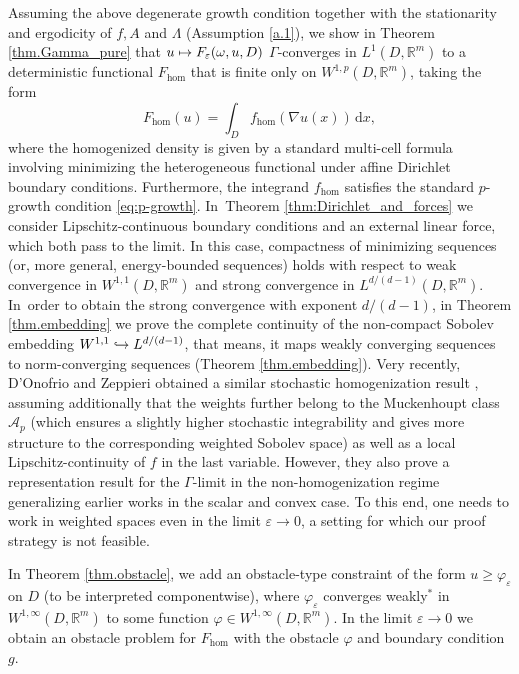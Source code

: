 \documentclass[JEP,XML,SOM,Unicode,published]{cedram}
\def\mto{\mathchoice{\longmapsto}{\mapsto}{\mapsto}{\mapsto}}
\def\hto{\mathrel{\lhook\joinrel\to}}
\theoremstyle{definition}
\let\e\varepsilon
\let\w\omega
\newcommand{\dx}{\,\mathrm{d}x}
\newcommand{\R}{\mathbb{R}}
\begin{document}
Assuming the above degenerate growth condition together with the stationarity and ergodicity of $f,A$ and $\Lambda$ (\cf Assumption \ref{a.1}), we show in Theorem \ref{thm.Gamma_pure} that $u\mto F_{\e}(\w,u,D)$ $\Gamma$-converges in $L^1(D,\R^m)$ to a deterministic functional $F_{\hom}$ that is finite only on $W^{1,p}(D,\R^m)$, taking the form\vspace*{-3pt}
\begin{equation*}
F_{\hom}(u)=\int_D f_{\hom}(\nabla u(x))\dx,
\end{equation*}
where the homogenized density is given by a standard multi-cell formula involving minimizing the heterogeneous functional under affine Dirichlet boundary conditions. Furthermore, the integrand $f_{\hom}$ satisfies the standard $p$-growth condition \eqref{eq:p-growth}. In~Theorem \ref{thm:Dirichlet_and_forces} we consider Lipschitz-continuous boundary conditions and an external linear force, which both pass to the limit. In this case, compactness of minimizing sequences (or, more general, energy-bounded sequences) holds with respect to weak convergence in $W^{1,1}(D,\R^m)$ and strong convergence in $L^{d/(d-1)}(D,\R^m)$. In~order to obtain the strong convergence with exponent $d/(d-1)$, in Theorem \ref{thm.embedding} we prove the complete continuity of the non-compact Sobolev embedding $W^{1,1}\hto\nobreak L^{d/(d-1)}$, that means, it maps weakly converging sequences to norm-converging sequences (\cf Theorem \ref{thm.embedding}). Very recently, D'Onofrio and Zeppieri obtained a similar stochastic homogenization result \cite{D'OnZe}, assuming additionally that the weights further belong to the Muckenhoupt class $\mathcal{A}_p$ (which ensures a slightly higher stochastic integrability and gives more structure to the corresponding weighted Sobolev space) as well as a local Lipschitz-continuity of $f$ in the last variable. However, they also prove a representation result for the $\Gamma$-limit in the non-homogenization regime generalizing earlier works \cite{CaSo,DeArc} in the scalar and convex case. To this end, one needs to work in weighted spaces even in the limit $\e\to 0$, a setting for which our proof strategy is not feasible.

In Theorem \ref{thm.obstacle}, we add an obstacle-type constraint of the form $u\geq\varphi_{\e}$ on $D$ (to be interpreted componentwise), where $\varphi_{\e}$ converges weakly$^*$ in $W^{1,\infty}(D,\R^m)$ to some function $\varphi\in W^{1,\infty}(D,\R^m)$. In the limit $\e\to 0$ we obtain an obstacle problem for $F_{\hom}$ with the obstacle $\varphi$ and boundary condition $g$.
\end{document}
